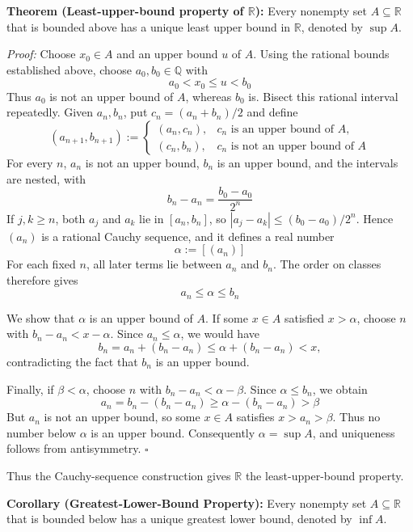 \documentclass[a4paper,11pt,abstracton]{scrartcl}
\newcommand{\RR}{\mathbb{R}}
\newcommand{\QQ}{\mathbb{Q}}
\theoremstyle{dotlessP}
\theoremstyle{dotlessS}
\theoremstyle{remark}
\theoremstyle{definition}
\begin{document}
\begin{problem_box}
\textbf{Theorem (Least-upper-bound property of $\RR$):}
Every nonempty set $A\subseteq\RR$ that is bounded above has a unique
least upper bound in $\RR$, denoted by $\sup A$.
\end{problem_box}

\begin{claim_box}
\textit{Proof:}
Choose $x_0\in A$ and an upper bound $u$ of $A$. Using the rational
bounds established above, choose $a_0,b_0\in\QQ$ with
\[
    a_0<x_0\le u<b_0
\]
Thus $a_0$ is not an upper bound of $A$, whereas $b_0$ is.
Bisect this rational interval repeatedly. Given $a_n,b_n$, put
$c_n=(a_n+b_n)/2$ and define
\[
    (a_{n+1},b_{n+1}):=
    \begin{cases}
        (a_n,c_n),&c_n\text{ is an upper bound of }A,\\
        (c_n,b_n),&c_n\text{ is not an upper bound of }A
    \end{cases}
\]
For every $n$, $a_n$ is not an upper bound, $b_n$ is an upper bound,
and the intervals are nested, with
\[
    b_n-a_n=\frac{b_0-a_0}{2^n}
\]
If $j,k\ge n$, both $a_j$ and $a_k$ lie in $[a_n,b_n]$, so
$|a_j-a_k|\le(b_0-a_0)/2^n$. Hence $(a_n)$ is a rational Cauchy
sequence, and it defines a real number
\[
    \alpha:=[(a_n)]
\]
For each fixed $n$, all later terms lie between $a_n$ and $b_n$.
The order on classes therefore gives
\[
    a_n\le\alpha\le b_n
\]

We show that $\alpha$ is an upper bound of $A$. If some $x\in A$
satisfied $x>\alpha$, choose $n$ with $b_n-a_n<x-\alpha$.
Since $a_n\le\alpha$, we would have
\[
    b_n=a_n+(b_n-a_n)\le\alpha+(b_n-a_n)<x,
\]
contradicting the fact that $b_n$ is an upper bound.

Finally, if $\beta<\alpha$, choose $n$ with $b_n-a_n<\alpha-\beta$.
Since $\alpha\le b_n$, we obtain
\[
    a_n=b_n-(b_n-a_n)\ge\alpha-(b_n-a_n)>\beta
\]
But $a_n$ is not an upper bound, so some $x\in A$ satisfies
$x>a_n>\beta$. Thus no number below $\alpha$ is an upper bound.
Consequently $\alpha=\sup A$, and uniqueness follows from antisymmetry.
\hfill$\square$
\end{claim_box}

Thus the Cauchy-sequence construction gives $\RR$ the least-upper-bound property.

\begin{problem_box}
\textbf{Corollary (Greatest-Lower-Bound Property):}
Every nonempty set $A\subseteq\RR$ that is bounded below has a unique
greatest lower bound, denoted by $\inf A$.
\end{problem_box}
\end{document}
